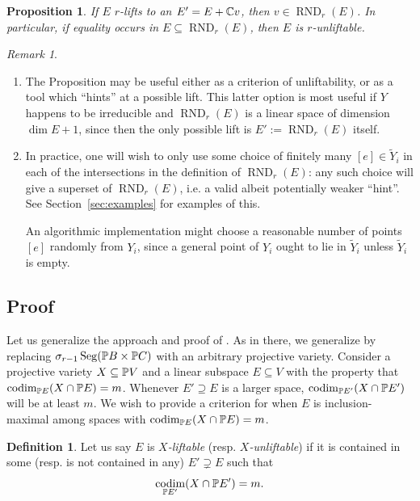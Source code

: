 \documentclass[a4paper,10pt]{article}
\DeclareMathOperator{\codim}{codim}
\DeclareMathOperator{\RND}{RND}
\DeclareMathOperator{\Seg}{Seg}
\def\uv#1{``#1''}
\newtheorem{prop}[theorem]{Proposition}
\theoremstyle{definition}
\newtheorem{definition}[theorem]{Definition}
\theoremstyle{remark}
\newtheorem*{remark}{Remark}
\begin{document}
\begin{prop}
    \label{prp:main-liftability}
    If $E$ $r$-lifts to an $E'=E+\ce v$, then $v\in \RND_r(E)$. In particular, if equality occurs in  $E\subseteq \RND_r(E)$, then $E$ is $r$-unliftable.
\end{prop}
\begin{remark}
    \begin{enumerate}
        \item The Proposition may be useful either as a criterion of unliftability, or as a tool which \uv{hints} at a possible lift. This latter option is most useful if $Y$ happens to be irreducible and $\RND_r(E)$ is a linear space of dimension $\dim E+1$, since then the only possible lift is $E':=\RND_r(E)$ itself.
        \item In practice, one will wish to only use some choice of finitely many $[e]\in\tilde Y_i$ in each of the intersections in the definition of $\RND_r(E)$: any such choice will give a superset of $\RND_r(E)$, i.e. a valid albeit potentially weaker \uv{hint}. See Section~\ref{sec:examples} for examples of this.

        An algorithmic implementation might choose a reasonable number of points $[e]$ randomly from $Y_i$, since a general point of $Y_i$ ought to lie in $\tilde Y_i$ unless $\tilde Y_i$ is empty.
    \end{enumerate}
\end{remark}


\subsection{Proof}

Let us generalize the approach and proof of \cite[Section 3]{draisma}. As in there, we generalize by replacing $\sigma_{r-1} \Seg(\pe B\times\pe C)$ with an arbitrary projective variety. Consider a projective variety $X\subseteq \pe V$ and a linear subspace $E\subseteq V$ with the property that $\codim_{\pe E}(X \cap \pe E) = m$. Whenever $E'\supseteq E$ is a larger space, $\codim_{\pe E'}(X\cap \pe E')$ will be at least $m$. We wish to provide a criterion for when $E$ is inclusion-maximal among spaces with $\codim_{\pe E}(X\cap \pe E)=m$.

\begin{definition}
    Let us say $E$ is \emph{$X$-liftable} (resp. \emph{$X$-unliftable}) if it is contained in some (resp. is not contained in any) $E'\supsetneq E$ such that
    \[
        \codim_{\pe E'} (X\cap \pe E') = m.
    \]
\end{definition}
\end{document}

